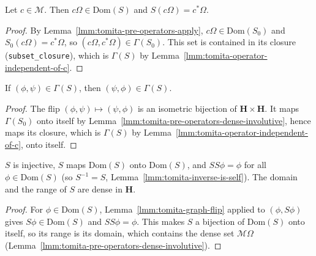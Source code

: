 \begin{lemma}
    \label{lmm:tomita-operator-on-algebra}
    \leanok
    Let $c \in \mathcal{M}$. Then $c\Omega \in \text{Dom}(S)$ and $S(c\Omega) = c^*\Omega$.
\end{lemma}
\begin{proof}
    \leanok
    By Lemma~\ref{lmm:tomita-pre-operators-apply}, $c\Omega \in \text{Dom}(S_0)$ and $S_0(c\Omega) = c^*\Omega$, so $(c\Omega, c^*\Omega) \in \Gamma(S_0)$. This set is contained in its closure (\texttt{subset\_closure}), which is $\Gamma(S)$ by Lemma~\ref{lmm:tomita-operator-independent-of-c}.
\end{proof}

\begin{lemma}
    \label{lmm:tomita-graph-flip}
    \leanok
    If $(\phi, \psi) \in \Gamma(S)$, then $(\psi, \phi) \in \Gamma(S)$.
\end{lemma}
\begin{proof}
    \leanok
    The flip $(\phi, \psi) \mapsto (\psi, \phi)$ is an isometric bijection of $\mathbf{H} \times \mathbf{H}$. It maps $\Gamma(S_0)$ onto itself by Lemma~\ref{lmm:tomita-pre-operators-dense-involutive}, hence maps its closure, which is $\Gamma(S)$ by Lemma~\ref{lmm:tomita-operator-independent-of-c}, onto itself.
\end{proof}

\begin{theorem}
    \label{thrm:tomita-operator-involution}
    \leanok
    $S$ is injective, $S$ maps $\text{Dom}(S)$ onto $\text{Dom}(S)$, and $S S \phi = \phi$ for all $\phi \in \text{Dom}(S)$ (so $S^{-1} = S$, Lemma~\ref{lmm:tomita-inverse-is-self}). The domain and the range of $S$ are dense in $\mathbf{H}$.
\end{theorem}
\begin{proof}
    \leanok
    For $\phi \in \text{Dom}(S)$, Lemma~\ref{lmm:tomita-graph-flip} applied to $(\phi, S\phi)$ gives $S\phi \in \text{Dom}(S)$ and $S S\phi = \phi$. This makes $S$ a bijection of $\text{Dom}(S)$ onto itself, so its range is its domain, which contains the dense set $\mathcal{M}\Omega$ (Lemma~\ref{lmm:tomita-pre-operators-dense-involutive}).
\end{proof}

